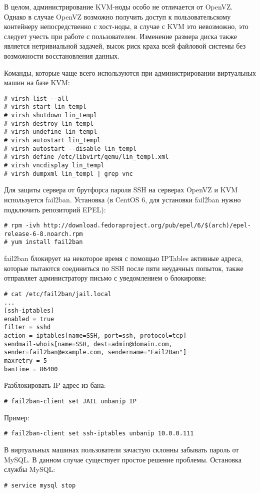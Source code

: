 В целом, администрирование KVM-ноды особо не отличается от OpenVZ.
Однако в случае OpenVZ возможно получить доступ к пользовательскому контейнеру непосредственно с хост-ноды, в случае с KVM это невозможно, это следует учесть при работе с пользователем.
Изменение размера диска также является нетривиальной задачей, высок риск краха всей файловой системы без возможности восстановления данных.

Команды, которые чаще всего используются при администрировании виртуальных машин на базе KVM:
\begin{lstlisting}
# virsh list --all
# virsh start lin_templ
# virsh shutdown lin_templ
# virsh destroy lin_templ
# virsh undefine lin_templ
# virsh autostart lin_templ
# virsh autostart --disable lin_templ
# virsh define /etc/libvirt/qemu/lin_templ.xml
# virsh vncdisplay lin_templ
# virsh dumpxml lin_templ | grep vnc
\end{lstlisting}

Для защиты сервера от брутфорса пароля SSH на серверах OpenVZ и KVM используется fail2ban.
Установка (в CentOS 6, для установки fail2ban нужно подключить репозиторий EPEL):
\begin{lstlisting}
# rpm -ivh http://download.fedoraproject.org/pub/epel/6/$(arch)/epel-release-6-8.noarch.rpm
# yum install fail2ban
\end{lstlisting}

fail2ban блокирует на некоторое время с помощью IPTables активные адреса, которые пытаются соединиться по SSH после пяти неудачных попыток, также отправляет администратору письмо с уведомлением о блокировке:
\begin{lstlisting}
# cat /etc/fail2ban/jail.local
...
[ssh-iptables]
enabled = true
filter = sshd
action = iptables[name=SSH, port=ssh, protocol=tcp]
sendmail-whois[name=SSH, dest=admin@domain.com, sender=fail2ban@example.com, sendername="Fail2Ban"]
maxretry = 5
bantime = 86400
\end{lstlisting}

Разблокировать IP адрес из бана:
\begin{lstlisting}
# fail2ban-client set JAIL unbanip IP
\end{lstlisting}

Пример:
\begin{lstlisting}
# fail2ban-client set ssh-iptables unbanip 10.0.0.111
\end{lstlisting}

В виртуальных машинах пользователи зачастую склонны забывать пароль от MySQL.
В данном случае существует простое решение проблемы.
Остановка службы MySQL:
\begin{lstlisting}
# service mysql stop
\end{lstlisting}

